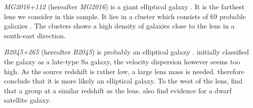 \documentclass[useAMS,usenatbib]{mn2e}
\begin{document}



\textit{MG2016+112} (hereafter \textit{MG2016}) is a giant elliptical galaxy \citep{1984Sci...223...46L,1986AJ.....91..991S}. It is the farthest lens we consider in this sample. It lies in a cluster which consists of 69 probable galaxies \citep{2003MNRAS.344..337T}. The clusters shows a high density of galaxies close to the lens in a south-east direction.

\textit{B2045+265} (hereafter \textit{B2045}) is probably an elliptical galaxy \citep{2007MNRAS.378..109M}. \cite{1999AJ....117..658F} initially classified the galaxy as a late-type Sa galaxy, the velocity dispersion however seems too high. As the source redshift is rather low, a large lens mass is needed. \cite{2007MNRAS.378..109M} therefore conclude that it is more likely an elliptical galaxy. To the west of the lens, \cite{1999AJ....117..658F} find that a group at a similar redshift as the lens. \cite{2007MNRAS.378..109M} also find evidence for a dwarf satellite galaxy.
\end{document}
